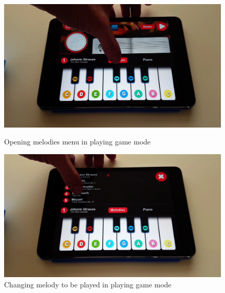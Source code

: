 \begin{figure}[ht!]
  \centering
  \includegraphics[width=350pt]{graphics/game-play/choose_melody_playing.png}
  \vspace{0.05cm}
  \caption{Opening melodies menu in playing game mode}
  \vspace{1cm}

  \includegraphics[width=350pt]{graphics/game-play/change_melody_playing.png}
  \vspace{0.05cm}
  \caption{Changing melody to be played in playing game mode}
\end{figure}

